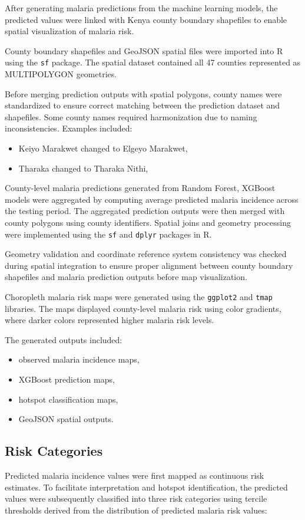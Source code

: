 After generating malaria predictions from the machine learning models, the predicted values were linked with Kenya county boundary shapefiles to enable spatial visualization of malaria risk.

County boundary shapefiles and GeoJSON spatial files were imported into R using the \texttt{sf} package. The spatial dataset contained all 47 counties represented as MULTIPOLYGON geometries.

Before merging prediction outputs with spatial polygons, county names were standardized to ensure correct matching between the prediction dataset and shapefiles. Some county names required harmonization due to naming inconsistencies. Examples included:

\begin{itemize}
	\item Keiyo Marakwet changed to Elgeyo Marakwet,
	\item Tharaka changed to Tharaka Nithi,
\end{itemize}

County-level malaria predictions generated from Random Forest, XGBoost models were aggregated by computing average predicted malaria incidence across the testing period. The aggregated prediction outputs were then merged with county polygons using county identifiers. Spatial joins and geometry processing were implemented using the \texttt{sf} and \texttt{dplyr} packages in R.

Geometry validation and coordinate reference system consistency was checked during spatial integration to ensure proper alignment between county boundary shapefiles and malaria prediction outputs before map visualization.


Choropleth malaria risk maps were generated using the \texttt{ggplot2} and \texttt{tmap} libraries. The maps displayed county-level malaria risk using color gradients, where darker colors represented higher malaria risk levels.

The generated outputs included:
\begin{itemize}
	\item observed malaria incidence maps,
	\item XGBoost prediction maps,
	\item hotspot classification maps,
	\item GeoJSON spatial outputs.
\end{itemize}


\subsection{Risk Categories}
Predicted malaria incidence values were first mapped as continuous risk estimates. To facilitate interpretation and hotspot identification, the predicted values were subsequently classified into three risk categories using tercile thresholds derived from the distribution of predicted malaria risk values:

